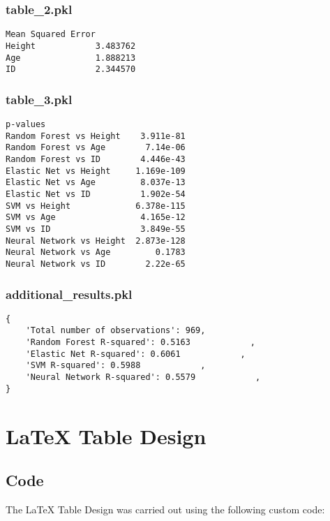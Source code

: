 \documentclass[11pt]{article}
\begin{document}
\subsubsection*{table\_2.pkl}

\begin{Verbatim}[tabsize=4]
        Mean Squared Error
Height            3.483762
Age               1.888213
ID                2.344570
\end{Verbatim}

\subsubsection*{table\_3.pkl}

\begin{Verbatim}[tabsize=4]
                            p-values
Random Forest vs Height    3.911e-81
Random Forest vs Age        7.14e-06
Random Forest vs ID        4.446e-43
Elastic Net vs Height     1.169e-109
Elastic Net vs Age         8.037e-13
Elastic Net vs ID          1.902e-54
SVM vs Height             6.378e-115
SVM vs Age                 4.165e-12
SVM vs ID                  3.849e-55
Neural Network vs Height  2.873e-128
Neural Network vs Age         0.1783
Neural Network vs ID        2.22e-65
\end{Verbatim}

\subsubsection*{additional\_results.pkl}

\begin{Verbatim}[tabsize=4]
{
    'Total number of observations': 969,
    'Random Forest R-squared': 0.5163            ,
    'Elastic Net R-squared': 0.6061            ,
    'SVM R-squared': 0.5988            ,
    'Neural Network R-squared': 0.5579            ,
}
\end{Verbatim}

\section{LaTeX Table Design}
\subsection{{Code}}
The LaTeX Table Design was carried out using the following custom code:
\end{document}
